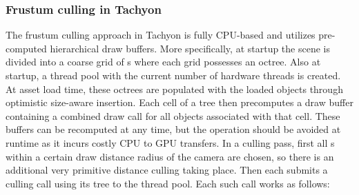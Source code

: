 \subsubsection{Frustum culling in Tachyon}
The frustum culling approach in Tachyon is fully CPU-based and utilizes pre-computed hierarchical draw buffers. More specifically, at startup the scene is divided into a coarse grid of s where each grid possesses an octree. Also at startup, a thread pool with the current number of hardware threads is created. At asset load time, these octrees are populated with the loaded objects through optimistic size-aware insertion. Each cell of a tree then precomputes a draw buffer containing a combined draw call for all objects associated with that cell. These buffers can be recomputed at any time, but the operation should be avoided at runtime as it incurs costly CPU to GPU transfers. 
In a culling pass, first all s within a certain draw distance radius of the camera are chosen, so there is an additional very primitive distance culling taking place. Then each  submits a culling call using its tree to the thread pool. Each such call works as follows: \\

